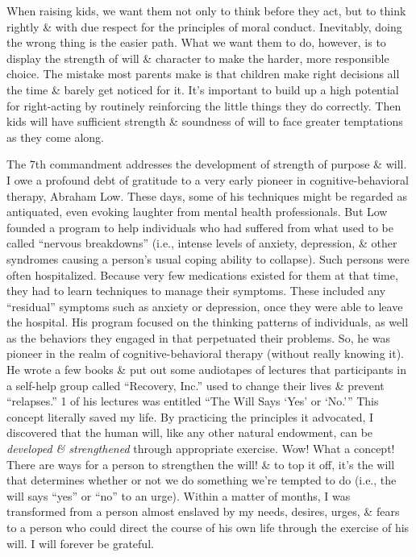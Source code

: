 \documentclass{article}
\numberwithin{equation}{section}
\begin{document}
When raising kids, we want them not only to think before they act, but to think rightly \& with due respect for the principles of moral conduct. Inevitably, doing the wrong thing is the easier path. What we want them to do, however, is to display the strength of will \& character to make the harder, more responsible choice. The mistake most parents make is that children make right decisions all the time \& barely get noticed for it. It's important to build up a high potential for right-acting by routinely reinforcing the little things they do correctly. Then kids will have sufficient strength \& soundness of will to face greater temptations as they come along.

The 7th commandment addresses the development of strength of purpose \& will. I owe a profound debt of gratitude to a very early pioneer in cognitive-behavioral therapy, Abraham Low. These days, some of his techniques might be regarded as antiquated, even evoking laughter from mental health professionals. But Low founded a program to help individuals who had suffered from what used to be called ``nervous breakdowns'' (i.e., intense levels of anxiety, depression, \& other syndromes causing a person's usual coping ability to collapse). Such persons were often hospitalized. Because very few medications existed for them at that time, they had to learn techniques to manage their symptoms. These included any ``residual'' symptoms such as anxiety or depression, once they were able to leave the hospital. His program focused on the thinking patterns of individuals, as well as the behaviors they engaged in that perpetuated their problems. So, he was pioneer in the realm of cognitive-behavioral therapy (without really knowing it). He wrote a few books \& put out some audiotapes of lectures that participants in a self-help group called ``Recovery, Inc.'' used to change their lives \& prevent ``relapses.'' 1 of his lectures was entitled ``The Will Says `Yes' or `No.''' This concept literally saved my life. By practicing the principles it advocated, I discovered that the human will, like any other natural endowment, can be \textit{developed \& strengthened} through appropriate exercise. Wow! What a concept! There are ways for a person to strengthen the will! \& to top it off, it's the will that determines whether or not we do something we're tempted to do (i.e., the will says ``yes'' or ``no'' to an urge). Within a matter of months, I was transformed from a person almost enslaved by my needs, desires, urges, \& fears to a person who could direct the course of his own life through the exercise of his will. I will forever be grateful.
\end{document}
